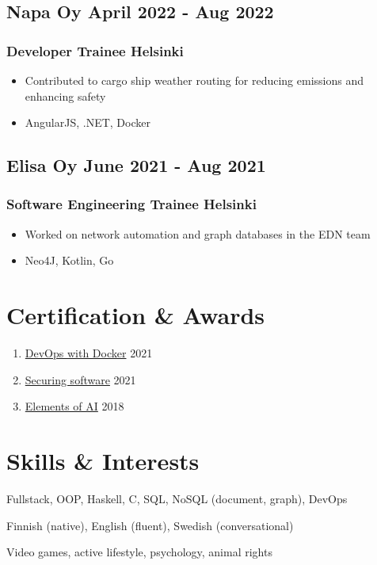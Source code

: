 \documentclass[11pt]{article} %
\begin{document}
\subsection{Napa Oy \hfill April 2022 - Aug 2022}
\subsubsection{Developer Trainee \hfill Helsinki}
\begin{itemize}
	\item Contributed to cargo ship weather routing for reducing emissions and enhancing safety
	\item AngularJS, .NET, Docker
\end{itemize}

\subsection{Elisa Oy \hfill June 2021 - Aug 2021}
\subsubsection{Software Engineering Trainee \hfill Helsinki}
\begin{itemize}
	\item Worked on network automation and graph databases in the EDN team
	\item Neo4J, Kotlin, Go
\end{itemize}

\section{Certification \& Awards}
\begin{enumerate}[label=\null, left=0pt..0pt, itemsep=0pt]
	\item \href{https://studies.cs.helsinki.fi/stats/api/certificate/docker2021/en/6432ff37598eb056cb40b1c54bf1253e}{DevOps with Docker} \hfill 2021
	\item \href{https://certificates.mooc.fi/validate/a4wa1ljd0ir}{Securing software} \hfill 2021
	\item \href{https://certificates.mooc.fi/validate/4saelkldpie}{Elements of AI} \hfill 2018
\end{enumerate}

\section{Skills \& Interests}
\begin{description}[itemsep=0pt]
	\item[Technical] Fullstack, OOP, Haskell, C, SQL, NoSQL (document, graph), DevOps
	\item[Language] Finnish (native), English (fluent), Swedish (conversational)
	\item[Interests] Video games, active lifestyle, psychology, animal rights
\end{description}
\end{document}
